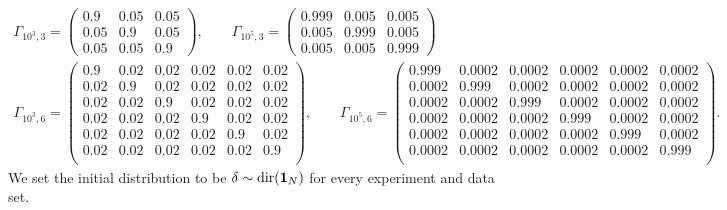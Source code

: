 \begin{gather*}
    \Gamma_{10^3,3} = 
    \begin{pmatrix} 
        0.9 & 0.05 & 0.05 \\
        0.05 & 0.9 & 0.05 \\
        0.05 & 0.05 & 0.9
    \end{pmatrix},
    \qquad
    \Gamma_{10^5,3} = 
    \begin{pmatrix} 
        0.999 & 0.005 & 0.005 \\
        0.005 & 0.999 & 0.005 \\
        0.005 & 0.005 & 0.999
    \end{pmatrix}
    \\
    \Gamma_{10^3,6} = 
    \begin{pmatrix} 
        0.9  & 0.02 & 0.02 & 0.02 & 0.02 & 0.02 \\
        0.02 & 0.9  & 0.02 & 0.02 & 0.02 & 0.02 \\
        0.02 & 0.02 & 0.9  & 0.02 & 0.02 & 0.02 \\
        0.02 & 0.02 & 0.02 & 0.9  & 0.02 & 0.02 \\
        0.02 & 0.02 & 0.02 & 0.02 & 0.9  & 0.02 \\
        0.02 & 0.02 & 0.02 & 0.02 & 0.02 & 0.9  \\
    \end{pmatrix},
    \qquad
    \Gamma_{10^5,6} = 
    \begin{pmatrix} 
        0.999  & 0.0002 & 0.0002 & 0.0002 & 0.0002 & 0.0002 \\
        0.0002 & 0.999  & 0.0002 & 0.0002 & 0.0002 & 0.0002 \\
        0.0002 & 0.0002 & 0.999  & 0.0002 & 0.0002 & 0.0002 \\
        0.0002 & 0.0002 & 0.0002 & 0.999  & 0.0002 & 0.0002 \\
        0.0002 & 0.0002 & 0.0002 & 0.0002 & 0.999  & 0.0002 \\
        0.0002 & 0.0002 & 0.0002 & 0.0002 & 0.0002 & 0.999  \\
    \end{pmatrix}.
\end{gather*}
%
We set the initial distribution to be $\delta \sim \text{dir}(\mathbf{1}_N)$ for every experiment and data set.

